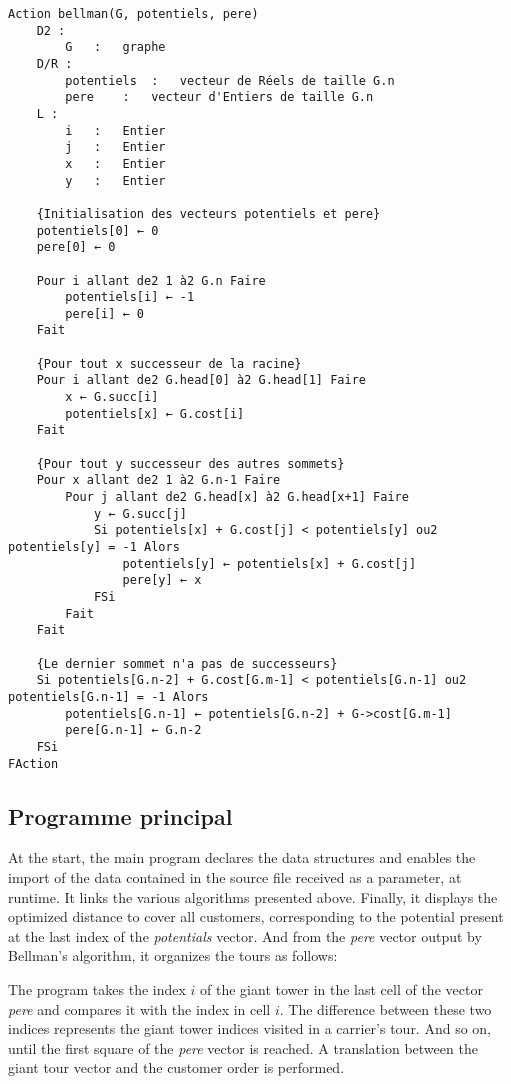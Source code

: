 \begin{lstlisting}[language=pseudo, caption={Bellman-Ford}, label=bellman]
Action bellman(G, potentiels, pere)
    D2 :
        G   :   graphe
    D/R :
        potentiels  :   vecteur de Réels de taille G.n
        pere    :   vecteur d'Entiers de taille G.n
    L :
        i   :   Entier
        j   :   Entier
        x   :   Entier
        y   :   Entier
    
    {Initialisation des vecteurs potentiels et pere}
	potentiels[0] ← 0
	pere[0] ← 0

    Pour i allant de2 1 à2 G.n Faire
		potentiels[i] ← -1
		pere[i] ← 0
	Fait

	{Pour tout x successeur de la racine}
	Pour i allant de2 G.head[0] à2 G.head[1] Faire
		x ← G.succ[i]
		potentiels[x] ← G.cost[i]
    Fait

	{Pour tout y successeur des autres sommets}
	Pour x allant de2 1 à2 G.n-1 Faire
        Pour j allant de2 G.head[x] à2 G.head[x+1] Faire
            y ← G.succ[j]
			Si potentiels[x] + G.cost[j] < potentiels[y] ou2 potentiels[y] = -1 Alors
				potentiels[y] ← potentiels[x] + G.cost[j]
				pere[y] ← x
			FSi
		Fait
	Fait

	{Le dernier sommet n'a pas de successeurs}
	Si potentiels[G.n-2] + G.cost[G.m-1] < potentiels[G.n-1] ou2 potentiels[G.n-1] = -1 Alors
		potentiels[G.n-1] ← potentiels[G.n-2] + G->cost[G.m-1]
		pere[G.n-1] ← G.n-2
	FSi
FAction
\end{lstlisting}

\subsection{Programme principal}

At the start, the main program declares the data structures and enables the import of the data contained in the source file received as a parameter, at runtime. It links the various algorithms presented above.
Finally, it displays the optimized distance to cover all customers, corresponding to the potential present at the last index of the \textit{potentials} vector. And from the \textit{pere} vector output by Bellman's algorithm, it organizes the tours as follows:

The program takes the index $i$ of the giant tower in the last cell of the vector \textit{pere} and compares it with the index in cell $i$. The difference between these two indices represents the giant tower indices visited in a carrier's tour. And so on, until the first square of the \textit{pere} vector is reached. A translation between the giant tour vector and the customer order is performed.

